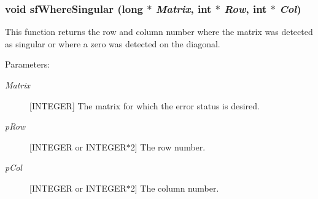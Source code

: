 \subsubsection{\setlength{\rightskip}{0pt plus 5cm}void sf\-Where\-Singular (long $\ast$ {\em Matrix}, int $\ast$ {\em Row}, int $\ast$ {\em Col})}\label{spFortran_8c_a77}


This function returns the row and column number where the matrix was detected as singular or where a zero was detected on the diagonal.\begin{Desc}
\item[Parameters: ]\par
\begin{description}
\item[{\em 
Matrix}][INTEGER] The matrix for which the error status is desired. \item[{\em 
p\-Row}][INTEGER or INTEGER$\ast$2] The row number. \item[{\em 
p\-Col}][INTEGER or INTEGER$\ast$2] The column number. \end{description}
\end{Desc}
